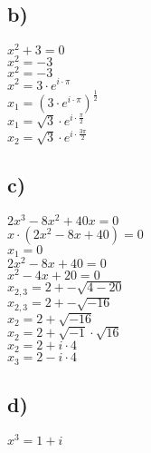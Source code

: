 \documentclass{article}
\begin{document}
	\subsection*{b)}
	$x^2 + 3 = 0$ \\
	$x^2 = -3$ \\
	$x^2 = -3$ \\
	$x^2 = 3 \cdot e^{i \cdot \pi}$ \\
	$x_{1} = (3 \cdot e^{i \cdot \pi})^{\frac{1}{2}}$ \\
	$x_{1} = \sqrt{3} \cdot e^{i \cdot \frac{\pi}{2}}$ \\
	$x_{2} = \sqrt{3} \cdot e^{i \cdot \frac{3\pi}{2}}$
	\subsection*{c)}
	$2x^{3} - 8x^{2} + 40x = 0$ \\
	$x \cdot (2x^2 - 8x + 40) = 0$ \\
	$x_{1} = 0$ \\
	$2x^2 - 8x + 40 = 0$ \\
	$x^2 - 4x + 20 = 0$ \\
	$x_{2,3} = 2 +- \sqrt{4 - 20}$ \\
	$x_{2,3} = 2 +- \sqrt{-16}$ \\
	$x_{2} = 2 + \sqrt{-16}$ \\
	$x_{2} = 2 + \sqrt{-1} \cdot \sqrt{16}$ \\
	$x_{2} = 2 + i \cdot 4$ \\
	$x_{3} = 2 - i \cdot 4$
	\subsection*{d)}
	$x^{3} = 1 + i$ \\
	
\end{document}
